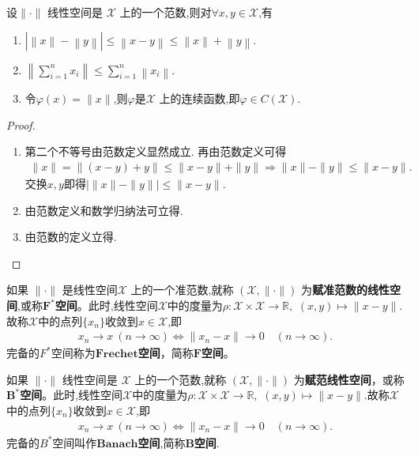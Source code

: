 \documentclass[../../main.tex]{subfiles}%
\begin{document}
\begin{proposition}\label{proposition:范数定义的基本推论}
设$\|\cdot\|$ 线性空间是 $\mathscr{X}$ 上的一个范数,则对$\forall x,y\in \mathscr{X}$,有
\begin{enumerate}[(1)]
\item\label{proposition:范数定义的基本推论-1} $\left| \left\| x \right\| -\left\| y \right\| \right|\leqslant \left\| x-y \right\| \leqslant \left\| x \right\| +\left\| y \right\| .$

\item\label{proposition:范数定义的基本推论-2} $\left\| \sum_{i=1}^n{x_i} \right\| \leqslant \sum_{i=1}^n{\left\| x_i \right\|}.$

\item\label{proposition:范数定义的基本推论-3} 令$\varphi(x)=\|x\|$,则$\varphi$是$\mathscr{X}$ 上的连续函数,即$\varphi \in C(\mathscr{X})$.
\end{enumerate}
\end{proposition}
\begin{proof}
\begin{enumerate}[(1)]
\item 第二个不等号由范数定义显然成立. 再由范数定义可得
\begin{align*}
\| x \| = \| (x-y) + y \| \leqslant \| x-y \| + \| y \| \Longrightarrow \| x \| - \| y \| \leqslant \| x-y \|.
\end{align*}
交换$x,y$即得$| \| x \| - \| y \| | \leqslant \| x-y \|.$

\item 由范数定义和数学归纳法可立得.

\item 由范数的定义立得.
\end{enumerate}
\end{proof}

\begin{definition}
如果 $\|\cdot\|$ 是线性空间$\mathscr{X}$ 上的一个准范数,就称 $(\mathscr{X},\|\cdot\|)$ 为\textbf{赋准范数的线性空间},或称$\bm{F}^*$\textbf{空间}。此时,线性空间$\mathscr{X}$中的度量为$\rho:\mathscr{X}\times \mathscr{X}\to \mathbb{R},\,\,(x,y)\mapsto \|x-y\|$.故称$\mathscr{X}$中的点列$\{x_n\}$收敛到$x\in \mathscr{X}$,即
\begin{align*}
x_n\to x\ (n\to\infty)\iff \|x_n-x\|\to0\quad(n\to\infty).
\end{align*}
完备的$F^*$空间称为$\mathbf{Frechet}$\textbf{空间}，简称$\bm{F}$\textbf{空间}。

如果 $\|\cdot\|$ 线性空间是 $\mathscr{X}$ 上的一个范数,就称 $(\mathscr{X},\|\cdot\|)$ 为\textbf{赋范线性空间}，或称$\bm{B}^*$\textbf{空间}。此时,线性空间$\mathscr{X}$中的度量为$\rho:\mathscr{X}\times \mathscr{X}\to \mathbb{R},\,\,(x,y)\mapsto \|x-y\|$.故称$\mathscr{X}$中的点列$\{x_n\}$收敛到$x\in \mathscr{X}$,即
\begin{align*}
x_n\to x\ (n\to\infty)\iff \|x_n-x\|\to0\quad(n\to\infty).
\end{align*}
完备的$B^*$空间叫作$\mathbf{Banach}$\textbf{空间},简称$\bm{B}$\textbf{空间}.
\end{definition}
\end{document}
